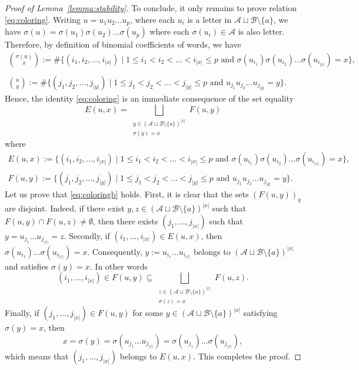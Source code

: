 \documentclass{template_arxiv}
\theoremstyle{definition}
\newcommand{\ds}{\displaystyle}
\newcommand{\A}{\mathcal{A}}
\newcommand{\B}{\mathcal{B}}
\begin{document}
\begin{proof}[Proof of Lemma~\ref{lemma:stability}]
\medskip

To conclude, it only remains to prove relation \eqref{eq:coloring}. Writing $u=u_1u_2\ldots u_p$, where each $u_i$ is a letter in $\A\sqcup\B\setminus\{a\}$, we have $\sigma(u)=\sigma(u_1)\sigma(u_2)\ldots\sigma(u_p)$ where each $\sigma(u_i)\in\A$ is also letter. Therefore, by definition of binomial coefficients of words, we have
\[
    \begin{array}{c}
        \ds\binom{\sigma(u)}{x}:=\#\big\{(i_1,i_2,\ldots,i_{|x|}) \;\big |\; 1\leq i_1<i_2<\ldots<i_{|x|}\leq p \text{ and } \sigma(u_{i_1})\sigma(u_{i_2})\ldots\sigma(u_{i_{|x|}})=x\big\},\\
        \\
        \ds\binom{u}{y}:=\#\big\{(j_1,j_2,\ldots,j_{|y|}) \;\big |\; 1\leq j_1<j_2<\ldots<j_{|y|}\leq p \text{ and } u_{j_1}u_{j_2}\ldots u_{j_{|y|}}=y\big\}.
    \end{array}
\]
Hence, the identity \eqref{eq:coloring} is an immediate consequence of the set equality
\begin{equation}\label{eq:coloringb}
    E(u,x)=\bigsqcup\limits_{\substack{y\in(\A\sqcup\B\setminus\{a\})^{|x|} \\ \sigma(y)=x}} F(u,y)
\end{equation}
where
\[
    \begin{array}{l}
        E(u,x):=\big\{(i_1,i_2,\ldots,i_{|x|}) \;\big |\; 1\leq i_1<i_2<\ldots<i_{|x|}\leq p \text{ and } \sigma(u_{i_1})\sigma(u_{i_2})\ldots\sigma(u_{i_{|x|}})=x\big\},\\
        F(u,y):=\big\{(j_1,j_2,\ldots,j_{|y|}) \;\big |\; 1\leq j_1<j_2<\ldots<j_{|y|}\leq p \text{ and } u_{j_1}u_{j_2}\ldots u_{j_{|y|}}=y\big\}.
    \end{array}
\]
Let us prove that \eqref{eq:coloringb} holds. First, it is clear that the sets $(F(u,y))_y$ are disjoint. Indeed, if there exist $y,z\in (\A\sqcup\B\setminus\{a\})^{|x|}$ such that $F(u,y)\cap F(u,z)\neq\emptyset$, then there exists $(j_1,\ldots,j_{|x|})$ such that $y=u_{j_1}\ldots u_{j_{|x|}}=z$. Secondly, if $(i_1,\ldots,i_{|x|})\in E(u,x)$, then $\sigma(u_{i_1})\ldots\sigma(u_{i_{|x|}})=x$. Consequently, $y:=u_{i_1}\ldots u_{i_{|x|}}$ belongs to $(\A\sqcup\B\setminus\{a\})^{|x|}$ and satisfies $\sigma(y)=x$. In other words
\[
    (i_1,\ldots,i_{|x|})\in F(u,y)\subseteq \bigsqcup\limits_{\substack{z\in(\A\sqcup\B\setminus\{a\})^{|x|} \\ \sigma(z)=x}} F(u,z).
\]
Finally, if $(j_1,\ldots,j_{|x|})\in F(u,y)$ for some $y\in(\A\sqcup\B\setminus\{a\})^{|x|}$ satisfying $\sigma(y)=x$, then
\[
    x=\sigma(y)=\sigma(u_{j_1}\ldots u_{j_{|x|}})=\sigma(u_{j_1})\ldots\sigma(u_{j_{|x|}}),
\]
which means that $(j_1,\ldots,j_{|x|})$ belongs to $E(u,x)$. This completes the proof.
\end{proof}
\end{document}
